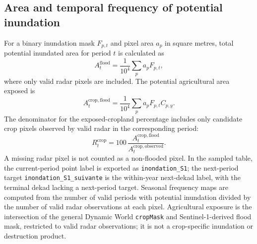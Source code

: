 \documentclass[pdflatex,sn-mathphys,Numbered]{sn-jnl}
\begin{document}
\subsection{Area and temporal frequency of potential inundation}
For a binary inundation mask $F_{p,t}$ and pixel area $a_p$ in square metres, total potential inundated area for period $t$ is calculated as
\begin{equation}
A^{\mathrm{flood}}_t=\frac{1}{10^4}\sum_p a_pF_{p,t},
\end{equation}
where only valid radar pixels are included. The potential agricultural area exposed is
\begin{equation}
A^{\mathrm{crop,flood}}_t=\frac{1}{10^4}\sum_p a_pF_{p,t}C_{p,y}.
\end{equation}
The denominator for the exposed-cropland percentage includes only candidate crop pixels observed by valid radar in the corresponding period:
\begin{equation}
R^{\mathrm{crop}}_t=100\,
\frac{A^{\mathrm{crop,flood}}_t}{A^{\mathrm{crop,observed}}_t}.
\end{equation}
A missing radar pixel is not counted as a non-flooded pixel. In the sampled table, the current-period point label is exported as \texttt{inondation\_S1}; the next-period target \texttt{inondation\_S1\_suivante} is the within-year next-dekad label, with the terminal dekad lacking a next-period target. Seasonal frequency maps are computed from the number of valid periods with potential inundation divided by the number of valid radar observations at each pixel. Agricultural exposure is the intersection of the general Dynamic World \texttt{cropMask} and Sentinel-1-derived flood mask, restricted to valid radar observations; it is not a crop-specific inundation or destruction product.
\end{document}
